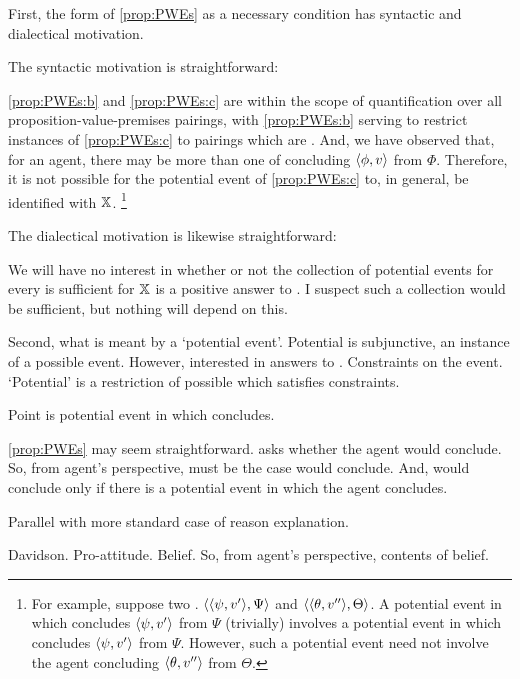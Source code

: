 \begin{note}
  First, the form of \autoref{prop:PWEs} as a necessary condition has syntactic and dialectical motivation.

  The syntactic motivation is straightforward:
  \begin{shiftpar}
    \ref{prop:PWEs:b} and \ref{prop:PWEs:c} are within the scope of quantification over all proposition-value-premises pairings, with \ref{prop:PWEs:b} serving to restrict instances of \ref{prop:PWEs:c} to pairings which are \requ{}.
    And, we have observed that, for an agent, there may be more than one \requ{} of concluding \(\pv{\phi}{v}\) from \(\Phi\).
    Therefore, it is not possible for the potential event of \ref{prop:PWEs:c} to, in general, be identified with \(\qzSaV{}\).%
    \footnote{
      For example, suppose two .
      \(\pvp{\psi}{v'}{\Psi}\) and \(\pvp{\theta}{v''}{\Theta}\).
      A potential event in which \vAgent{} concludes \(\pv{\psi}{v'}\) from \(\Psi\) (trivially) involves a potential event in which \vAgent{} concludes \(\pv{\psi}{v'}\) from \(\Psi\).
      However, such a potential event need not involve the agent concluding \(\pv{\theta}{v''}\) from \(\Theta\).
    }
  \end{shiftpar}

  The dialectical motivation is likewise straightforward:

  \begin{shiftpar}
    We will have no interest in whether or not the collection of potential events for every \requ{} is sufficient for \(\qzSaV{}\) is a positive answer to \qzS{}.
    I suspect such a collection would be sufficient, but nothing will depend on this.
  \end{shiftpar}
\end{note}

\begin{note}
  Second, what is meant by a `potential event'.
  Potential is subjunctive, an instance of a possible event.
  However, interested in answers to \qzS{}.
  Constraints on the event.
  `Potential' is a restriction of possible which satisfies constraints.
\end{note}

\begin{note}
  Point is potential event in which concludes.

  \autoref{prop:PWEs} may seem straightforward.
  \qzS{} asks whether the agent would conclude.
  So, from agent's perspective, must be the case would conclude.
  And, would conclude only if there is a potential event in which the agent concludes.

  Parallel with more standard case of reason explanation.

  Davidson.
  Pro-attitude.
  Belief.
  So, from agent's perspective, contents of belief.
\end{note}

